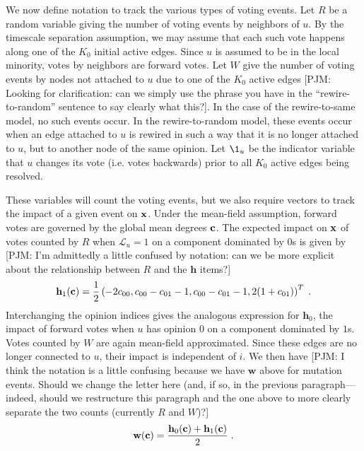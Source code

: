 \documentclass[review, onefignum, onetabnum]{siamart171218}
\newcommand{\pjm}[1]{{\color{blue}[PJM: #1]}}
\begin{document}
		We now define notation to track the various types of voting events. 
		Let $R$ be a random variable giving the number of voting events by neighbors of $u$. 
		By the timescale separation assumption, we may assume that each such vote happens along one of the $K_0$ initial active edges. 
		Since $u$ is assumed to be in the local minority, votes by neighbors are forward votes. 
		Let $W$ give the number of voting events by nodes not attached to $u$ due to one of the $K_0$ active edges \pjm{Looking for clarification: can we simply use the phrase you have in the ``rewire-to-random'' sentence to say clearly what this?}. 
		In the case of the rewire-to-same model, no such events occur. 
		In the rewire-to-random model, these events occur when an edge attached to $u$ is rewired in such a way that it is no longer attached to $u$, but to another node of the same opinion. 
		Let $\1_u$ be the indicator variable that $u$ changes its vote (i.e. votes backwards) prior to all $K_0$ active edges being resolved. 

		These variables will count the voting events, but we also require vectors to track the impact of a given event on $\mathbf{x}$. 
		Under the mean-field assumption, forward votes are governed by the global mean degrees $\mathbf{c}$. 
		The expected impact on $\mathbf{x}$ of votes counted by $R$ when $\mathcal{L}_u = 1$ on a component dominated by $0$s is given by \pjm{I'm admittedly a little confused by notation: can we be more explicit about the relationship between $R$ and the $\mathbf{h}$ items?}
		\begin{align}
			\mathbf{h}_1(\mathbf{c}) = \frac{1}{2}\left(-2c_{00} , c_{00} - c_{01} - 1, c_{00} - c_{01} - 1, 2(1+c_{01})\right)^T\;.
		\end{align}
		Interchanging the opinion indices gives the analogous expression for $\mathbf{h}_0$, the impact of forward votes when $u$ has opinion $0$ on a component dominated by $1$s. 
		Votes counted by $W$ are again mean-field approximated. 
		Since these edges are no longer connected to $u$, their impact is independent of $i$. 
		We then have \pjm{I think the notation is a little confusing because we have $\mathbf{w}$ above for mutation events. Should we change the letter here (and, if so, in the previous paragraph---indeed, should we restructure this paragraph and the one above to more clearly separate the two counts (currently $R$ and $W$)?}
		\begin{align}
			\mathbf{w}(\mathbf{c}) = \frac{\mathbf{h}_0(\mathbf{c}) + \mathbf{h}_1(\mathbf{c})}{2}\;.
		\end{align}
\end{document}

